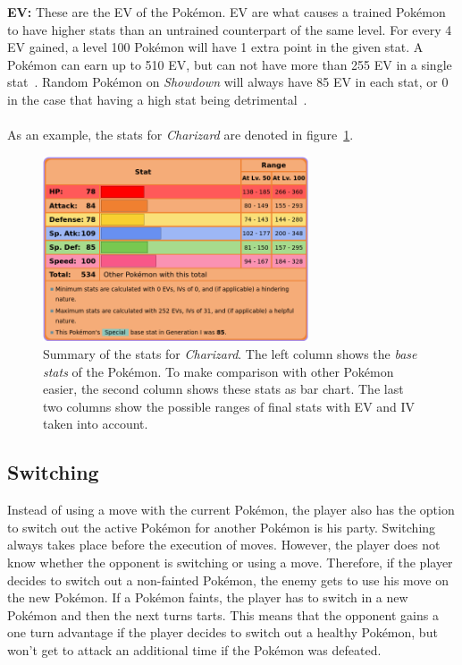 \textbf{EV:} These are the \ac{EV} of the Pokémon. \ac{EV} are what causes a trained Pokémon to have higher
stats than an untrained counterpart of the same level. For every 4 \ac{EV} gained, a level 100 Pokémon 
will have 1 extra point in the given stat. A Pokémon can earn up to 510 \ac{EV}, but can not have more than
255 \ac{EV} in a single stat~\autocite{Bulbapedia:Stat}. Random Pokémon on \textit{Showdown} will always have 85 
\ac{EV} in each stat, or 0 in the case that having a high stat being detrimental~\autocite{Smogon:RandBatsGuide}.
\\
\\
As an example, the stats for \textit{Charizard} are denoted in figure~\ref{fig:charizard-stats}. 
\begin{figure}[h]
	\centering
	\includegraphics[width=0.7\textwidth]{images/charizard-stats.png}
	\caption{Summary of the stats for \textit{Charizard}. The left column shows the
	\textit{base stats} of the Pokémon. To make comparison with other Pokémon easier, 
	the second column shows these stats as bar chart. The last two columns show the
	possible ranges of final stats with \ac{EV} and \ac{IV} taken into account.}
	\label{fig:charizard-stats}
\end{figure}

\subsection{Switching}
\label{sec:switching}
Instead of using a move with the current Pokémon, the player also has the option to switch out the 
active Pokémon for another Pokémon is his party. Switching always takes place before the execution of moves.
However, the player does not know whether the opponent is switching or using a move. Therefore, if the 
player decides to switch out a non-fainted Pokémon, the enemy gets to use his move on the new Pokémon.
If a Pokémon faints, the player has to switch in a new Pokémon and then the next turns tarts. This means
that the opponent gains a one turn advantage if the player decides to switch out a healthy Pokémon, but
won't get to attack an additional time if the Pokémon was defeated.  

